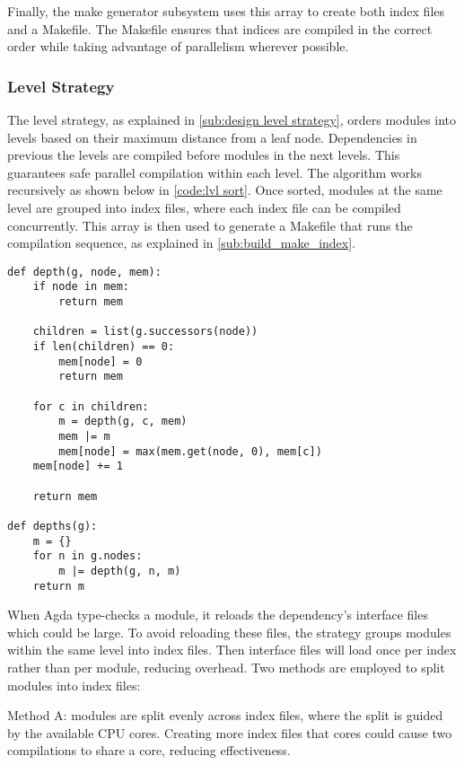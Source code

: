 Finally, the make generator subsystem uses this array to create both index
files and a Makefile. The Makefile ensures that indices are compiled in the
correct order while taking advantage of parallelism wherever possible.

\subsubsection{Level Strategy} \label{sub:imp lvl strategy}

The level strategy, as explained in \cref{sub:design level strategy}, orders
modules into levels based on their maximum distance from a leaf node.
Dependencies in previous the levels are compiled before modules in the next
levels. This guarantees safe parallel compilation within each level. The
algorithm works recursively as shown below in \cref{code:lvl sort}. Once sorted,
modules at the same level are grouped into index files, where each index file
can be compiled concurrently. This array is then used to generate a Makefile
that runs the compilation sequence, as explained in
\cref{sub:build_make_index}.

\noindent
\begin{minipage}{\textwidth}
\begin{lstlisting}[caption={Level Sort Algorithm},label={code:lvl sort}]
def depth(g, node, mem):
    if node in mem:
        return mem

    children = list(g.successors(node))
    if len(children) == 0:
        mem[node] = 0
        return mem

    for c in children:
        m = depth(g, c, mem)
        mem |= m
        mem[node] = max(mem.get(node, 0), mem[c])
    mem[node] += 1

    return mem

def depths(g):
    m = {}
    for n in g.nodes:
        m |= depth(g, n, m)
    return m
\end{lstlisting}
\end{minipage}

When Agda type-checks a module, it reloads the dependency's interface files
which could be large. To avoid reloading these files, the strategy groups
modules within the same level into index files. Then interface files will load
once per index rather than per module, reducing overhead. Two methods are
employed to split modules into index files:

Method A: modules are split evenly across index files, where the split is
guided by the available CPU cores. Creating more index files  that cores could
cause two compilations to share a core, reducing effectiveness.

